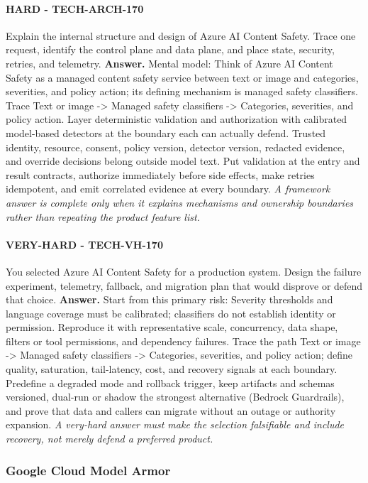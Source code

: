 \paragraph{HARD - TECH-ARCH-170} Explain the internal structure and design of Azure AI Content Safety. Trace one request, identify the control plane and data plane, and place state, security, retries, and telemetry.
\textbf{Answer.} Mental model: Think of Azure AI Content Safety as a managed content safety service between text or image and categories, severities, and policy action; its defining mechanism is managed safety classifiers. Trace Text or image -> Managed safety classifiers -> Categories, severities, and policy action. Layer deterministic validation and authorization with calibrated model-based detectors at the boundary each can actually defend. Trusted identity, resource, consent, policy version, detector version, redacted evidence, and override decisions belong outside model text. Put validation at the entry and result contracts, authorize immediately before side effects, make retries idempotent, and emit correlated evidence at every boundary.
\textit{A framework answer is complete only when it explains mechanisms and ownership boundaries rather than repeating the product feature list.}
\paragraph{VERY-HARD - TECH-VH-170} You selected Azure AI Content Safety for a production system. Design the failure experiment, telemetry, fallback, and migration plan that would disprove or defend that choice.
\textbf{Answer.} Start from this primary risk: Severity thresholds and language coverage must be calibrated; classifiers do not establish identity or permission. Reproduce it with representative scale, concurrency, data shape, filters or tool permissions, and dependency failures. Trace the path Text or image -> Managed safety classifiers -> Categories, severities, and policy action; define quality, saturation, tail-latency, cost, and recovery signals at each boundary. Predefine a degraded mode and rollback trigger, keep artifacts and schemas versioned, dual-run or shadow the strongest alternative (Bedrock Guardrails), and prove that data and callers can migrate without an outage or authority expansion.
\textit{A very-hard answer must make the selection falsifiable and include recovery, not merely defend a preferred product.}
\subsubsection*{Google Cloud Model Armor}
